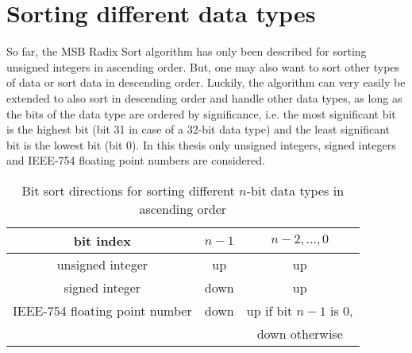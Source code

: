 \documentclass[12pt, a4paper, openright, twoside]{tiarbeit}
\begin{document}
%
%


\section{Sorting different data types}
So far, the MSB Radix Sort algorithm has only been described for sorting unsigned integers
in ascending order.
But, one may also want to sort other types of data or sort data in descending order.
Luckily, the algorithm can very easily be extended to also sort in descending order and
handle other data types,
as long as the bits of the data type are ordered by significance, i.e. the
most significant bit is the highest bit (bit 31 in case of a 32-bit data type)
and the least significant bit is the lowest bit (bit 0).
In this thesis only unsigned integers, signed integers and
IEEE-754 floating point numbers are considered.

\begin{table}[b!]
  \centering
  \begin{tabular}{c|c|c}
    bit index                      & $n-1$ & $n-2,\dots,0$         \\
    \hline
    unsigned integer               & up    & up                    \\
    signed integer                 & down  & up                    \\
    IEEE-754 floating point number & down  & up if bit $n-1$ is 0, \\
                                   &       & down otherwise        \\
  \end{tabular}
  \caption{Bit sort directions for sorting different $n$-bit data types in ascending order
    \citep{float_radix_sort, moeller_radix}}
  \label{tab:bit_sort_directions}
\end{table}
\end{document}
